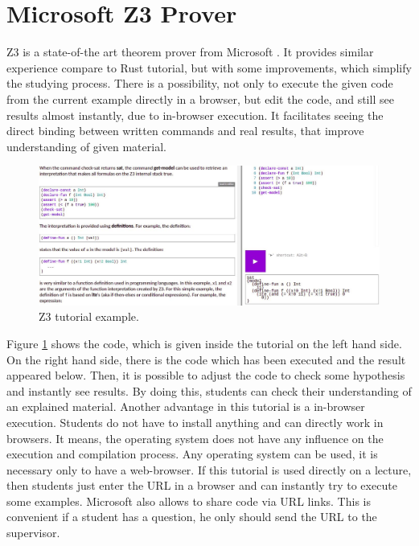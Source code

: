 \section{Microsoft Z3 Prover} \label{sec:z3}
Z3 is a state-of-the art theorem prover from Microsoft \cite{Z3Prover}. It provides similar experience compare to Rust tutorial, but with some improvements, which simplify the studying process. There is a possibility, not only to execute the given code from the current example directly in a browser, but edit the code, and still see results almost instantly, due to in-browser execution. It facilitates seeing the direct binding between written commands and real results, that improve understanding of given material.
\begin{figure}[h!]
    \centering
    \includegraphics[width=\linewidth]{src/pic/z3}
    \caption{Z3 tutorial example.}
    \label{fig:z3}
\end{figure} \newline
Figure \ref{fig:z3} shows the code, which is given inside the tutorial on the left hand side. On the right hand side, there is the code which has been executed and the result appeared below. Then, it is possible to adjust the code to check some hypothesis and instantly see results. By doing this, students can check their understanding of an explained material. Another advantage in this tutorial is a in-browser execution. Students do not have to install anything and can directly work in browsers. It means, the operating system does not have any influence on the execution and compilation process. Any operating system can be used, it is necessary only to have a web-browser. If this tutorial is used directly on a lecture, then students just enter the URL in a browser and can instantly try to execute some examples. Microsoft also allows to share code via URL links. This is convenient if a student has a question, he only should send the URL to the supervisor.

